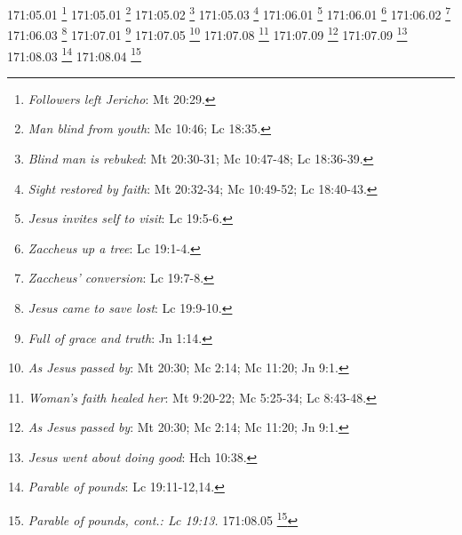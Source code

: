 {{{{{{{{{{{{{{{{{{{{{{{{{{{{{{{{{{{{{{{{{{{{{{{{{{171:05.01 \footnote{\textit{Followers left Jericho}: Mt 20:29.}
171:05.01 \footnote{\textit{Man blind from youth}: Mc 10:46; Lc 18:35.}
171:05.02 \footnote{\textit{Blind man is rebuked}: Mt 20:30-31; Mc 10:47-48; Lc 18:36-39.}
171:05.03 \footnote{\textit{Sight restored by faith}: Mt 20:32-34; Mc 10:49-52; Lc 18:40-43.}
171:06.01 \footnote{\textit{Jesus invites self to visit}: Lc 19:5-6.}
171:06.01 \footnote{\textit{Zaccheus up a tree}: Lc 19:1-4.}
171:06.02 \footnote{\textit{Zaccheus' conversion}: Lc 19:7-8.}
171:06.03 \footnote{\textit{Jesus came to save lost}: Lc 19:9-10.}
171:07.01 \footnote{\textit{Full of grace and truth}: Jn 1:14.}
171:07.05 \footnote{\textit{As Jesus passed by}: Mt 20:30; Mc 2:14; Mc 11:20; Jn 9:1.}
171:07.08 \footnote{\textit{Woman's faith healed her}: Mt 9:20-22; Mc 5:25-34; Lc 8:43-48.}
171:07.09 \footnote{\textit{As Jesus passed by}: Mt 20:30; Mc 2:14; Mc 11:20; Jn 9:1.}
171:07.09 \footnote{\textit{Jesus went about doing good}: Hch 10:38.}
171:08.03 \footnote{\textit{Parable of pounds}: Lc 19:11-12,14.}
171:08.04 \footnote{\textit{Parable of pounds, cont.: Lc 19:13.}
171:08.05 \footnote{\textit{Parable of pounds, cont.: Lc 19:15a.}
171:08.06 \footnote{\textit{Parable of Pounds, cont.: Mt 25:19-27; Lc 19:15b-23.}
171:08.07 \footnote{\textit{Parable of Pounds, concluded}: Mt 25:28-29.}
171:08.07 \footnote{\textit{Parable of Pounds, concluded.: Lc 19:24-26.}
171:08.15 \footnote{\textit{Resumed journey}: Lc 19:28.}
172:00.03 \footnote{\textit{Many people there to see Jesus}: Jn 12:9.}
172:00.03 \footnote{\textit{The plot}: Jn 11:57.}
172:01.01 \footnote{\textit{Officials speculate about visit}: Jn 11:55-56.}
172:01.02 \footnote{\textit{The banquet}: Mt 26:6; Mc 14:3a; Jn 12:1-2.}
172:01.03 \footnote{\textit{Jericho's walls}: Jos 6:20.}
172:01.05 \footnote{\textit{Anointment of Jesus by woman}: Mt 26:7-9; Mc 14:3b-5; Jn 11:2; Jn 12:3-5.}
172:01.06 \footnote{\textit{Jesus defends Mary}: Mt 26:10-13; Mc 14:6-9; Jn 12:7-8.}
172:01.07 \footnote{\textit{Cost of ointment}: Mt 26:7; Mc 14:3; Jn 12:3.}
172:01.07 \footnote{\textit{Judas decides on betrayal}: Mt 26:14-16; Mc 14:10-11; Lc 22:3-6.}
172:01.09 \footnote{\textit{Plot death of Lazarus}: Jn 12:10-11.}
172:03.04 \footnote{\textit{Enter on colt}: Zac 9:9.}
172:03.04 \footnote{\textit{Planning entry into Jerusalem}: Mt 21:4-5; Jn 12:14b-15.}
172:03.06 \footnote{\textit{Apostles retrieve colt}: Mt 21:6-7a; Mc 11:6-7a; Lc 19:32-35a.}
172:03.06 \footnote{\textit{Apostles sent for colt}: Mt 21:1-3; Mc 11:1-3; Lc 19:29-31.}
172:03.07 \footnote{\textit{Crowds gather}: Jn 12:17-18.}
172:03.09 \footnote{\textit{Blessed is he who comes --: Sal 118:26.}
}}}}}}}}}}}}}}}}}}}}}}}}}}}}}}}}}}}}}}}}}}}}}}}}}}}}}}}
